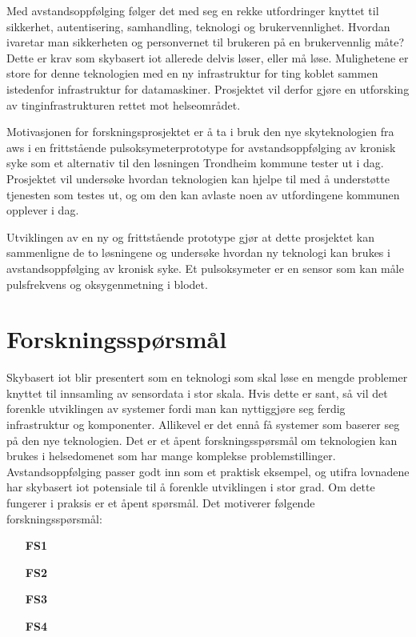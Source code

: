 Med avstandsoppfølging følger det med seg en rekke utfordringer knyttet til sikkerhet, autentisering, samhandling,
teknologi og brukervennlighet. Hvordan ivaretar man sikkerheten og personvernet til brukeren på en brukervennlig måte?
Dette er krav som skybasert \gls{iot} allerede delvis løser, eller må løse. Mulighetene er store for denne teknologien
med en ny infrastruktur for ting koblet sammen istedenfor infrastruktur for datamaskiner. Prosjektet vil derfor gjøre en utforsking
av tinginfrastrukturen rettet mot helseområdet.

Motivasjonen for forskningsprosjektet er å ta i bruk den nye skyteknologien fra \gls{aws} i en frittstående
pulsoksymeterprototype for avstandsoppfølging av kronisk syke som et alternativ til den løsningen Trondheim
kommune tester ut i dag. Prosjektet vil undersøke hvordan teknologien kan hjelpe til med å understøtte tjenesten som testes ut,
og om den kan avlaste noen av utfordingene kommunen opplever i dag.

Utviklingen av en ny og frittstående prototype gjør at dette prosjektet kan sammenligne de to løsningene og undersøke hvordan ny
teknologi kan brukes i avstandsoppfølging av kronisk syke. Et pulsoksymeter er en sensor som kan måle pulsfrekvens og oksygenmetning i blodet. 

\section{Forskningsspørsmål}
\label{sec:res_questions}
Skybasert \gls{iot} blir presentert som en teknologi som skal løse en mengde problemer knyttet til innsamling av sensordata i stor skala. Hvis dette
er sant, så vil det forenkle utviklingen av systemer fordi man kan nyttiggjøre seg ferdig infrastruktur og komponenter. Allikevel
er det ennå få systemer som baserer seg på den nye teknologien. Det er et åpent forskningsspørsmål om teknologien kan brukes i helsedomenet
som har mange komplekse problemstillinger. Avstandsoppfølging passer godt inn som et praktisk eksempel, og utifra lovnadene har
skybasert \gls{iot} potensiale til å forenkle utviklingen i stor grad. Om dette fungerer i praksis er et åpent spørsmål.
Det motiverer følgende forskningsspørsmål:

\begin{enumerate}
    \item[\textbf{FS1}] 
    \item[\textbf{FS2}] 
    \item[\textbf{FS3}] 
    \item[\textbf{FS4}] 
\end{enumerate}

